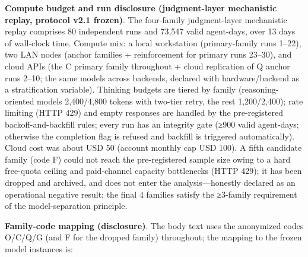 \documentclass[
  11pt]{article}
\begin{document}
\textbf{Compute budget and run disclosure (judgment-layer mechanistic
replay, protocol v2.1 frozen)}. The four-family judgment-layer
mechanistic replay comprises 80 independent runs and 73,547 valid
agent-days, over 13 days of wall-clock time. Compute mix: a local
workstation (primary-family runs 1--22), two LAN nodes (anchor families
+ reinforcement for primary runs 23--30), and cloud APIs (the C primary
family throughout + cloud replication of Q anchor runs 2--10; the same
models across backends, declared with hardware/backend as a
stratification variable). Thinking budgets are tiered by family
(reasoning-oriented models 2,400/4,800 tokens with two-tier retry, the
rest 1,200/2,400); rate limiting (HTTP 429) and empty responses are
handled by the pre-registered backoff-and-backfill rules; every run has
an integrity gate (≥900 valid agent-days; otherwise the completion flag
is refused and backfill is triggered automatically). Cloud cost was
about USD 50 (account monthly cap USD 100). A fifth candidate family
(code F) could not reach the pre-registered sample size owing to a hard
free-quota ceiling and paid-channel capacity bottlenecks (HTTP 429); it
has been dropped and archived, and does not enter the
analysis---honestly declared as an operational negative result; the
final 4 families satisfy the ≥3-family requirement of the
model-separation principle.

\textbf{Family-code mapping (disclosure)}. The body text uses the
anonymized codes O/C/Q/G (and F for the dropped family) throughout; the
mapping to the frozen model instances is:
\end{document}
